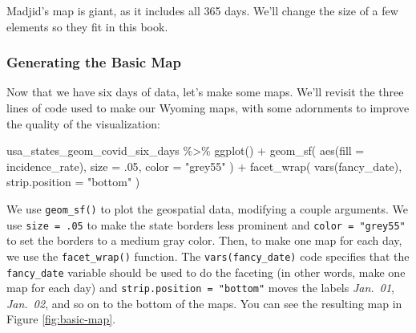 \documentclass[
]{book}
\newenvironment{Shaded}{\begin{snugshade}}{\end{snugshade}}
\newcommand{\AttributeTok}[1]{\textcolor[rgb]{0.77,0.63,0.00}{#1}}
\newcommand{\DecValTok}[1]{\textcolor[rgb]{0.00,0.00,0.81}{#1}}
\newcommand{\FunctionTok}[1]{\textcolor[rgb]{0.00,0.00,0.00}{#1}}
\newcommand{\NormalTok}[1]{#1}
\newcommand{\SpecialCharTok}[1]{\textcolor[rgb]{0.00,0.00,0.00}{#1}}
\newcommand{\StringTok}[1]{\textcolor[rgb]{0.31,0.60,0.02}{#1}}
\begin{document}
Madjid's map is giant, as it includes all 365 days. We'll change the size of a few elements so they fit in this book.

\hypertarget{generating-the-basic-map}{%
\subsubsection*{Generating the Basic Map}\label{generating-the-basic-map}}

Now that we have six days of data, let's make some maps. We'll revisit the three lines of code used to make our Wyoming maps, with some adornments to improve the quality of the visualization:

\begin{Shaded}
\begin{Highlighting}[]
\NormalTok{usa\_states\_geom\_covid\_six\_days }\SpecialCharTok{\%\textgreater{}\%}
  \FunctionTok{ggplot}\NormalTok{() }\SpecialCharTok{+}
  \FunctionTok{geom\_sf}\NormalTok{(}
    \FunctionTok{aes}\NormalTok{(}\AttributeTok{fill =}\NormalTok{ incidence\_rate),}
    \AttributeTok{size =}\NormalTok{ .}\DecValTok{05}\NormalTok{,}
    \AttributeTok{color =} \StringTok{"grey55"}
\NormalTok{  ) }\SpecialCharTok{+}
  \FunctionTok{facet\_wrap}\NormalTok{(}
    \FunctionTok{vars}\NormalTok{(fancy\_date),}
    \AttributeTok{strip.position =} \StringTok{"bottom"}
\NormalTok{  )}
\end{Highlighting}
\end{Shaded}

We use \texttt{geom\_sf()} to plot the geospatial data, modifying a couple arguments. We use \texttt{size\ =\ .05} to make the state borders less prominent and \texttt{color\ =\ "grey55"} to set the borders to a medium gray color. Then, to make one map for each day, we use the \texttt{facet\_wrap()} function. The \texttt{vars(fancy\_date)} code specifies that the \texttt{fancy\_date} variable should be used to do the faceting (in other words, make one map for each day) and \texttt{strip.position\ =\ "bottom"} moves the labels \emph{Jan.~01}, \emph{Jan.~02}, and so on to the bottom of the maps. You can see the resulting map in Figure \ref{fig:basic-map}.
\end{document}
